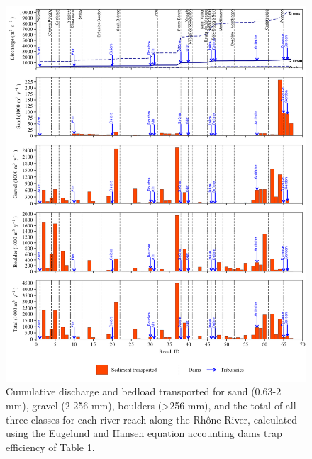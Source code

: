\documentclass[
]{book}
\begin{document}
\begin{figure}
\includegraphics[width=26.24in]{img/res_cascade/res_E2_eE&H/plots_transp-silt/transp_res_sum_hy_E2_eE&H} \caption{Cumulative discharge and bedload transported for sand (0.63-2 mm), gravel (2-256 mm), boulders (>256 mm), and the total of all three classes for each river reach along the Rhône River, calculated using the Eugelund and Hansen equation accounting dams trap efficiency of Table 1.}\label{fig:TrE2eE}
\end{figure}
\end{document}
